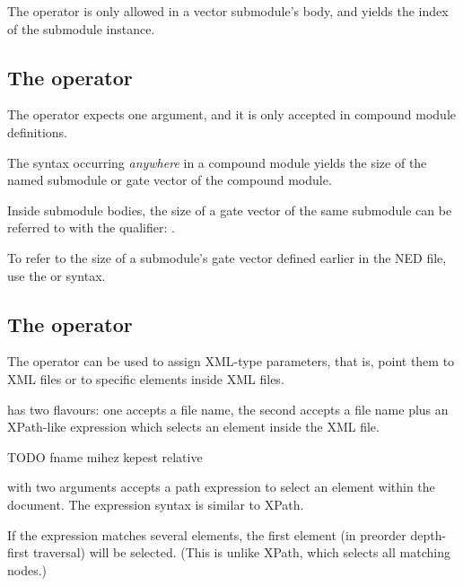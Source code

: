The  operator is only allowed in a vector submodule's body,
and yields the index of the submodule instance.


\subsection{The  operator}

The  operator expects one argument, and it is only accepted
in compound module definitions.

The  syntax occurring \textit{anywhere} in a compound
module yields the size of the named submodule or gate vector of the
compound module.

Inside submodule bodies, the size of a gate vector of the same submodule
can be referred to with the  qualifier: .

To refer to the size of a submodule's gate vector defined earlier in the
NED file, use the  or
 syntax.


\subsection{The  operator}

The  operator can be used to assign XML-type parameters,
that is, point them to XML files or to specific elements inside XML files.

 has two flavours: one accepts a file name, the second accepts
a file name plus an XPath-like expression which selects an element
inside the XML file.

TODO fname mihez kepest relative

 with two arguments accepts a path expression
to select an element within the document. The expression syntax is
similar to XPath.

If the expression matches several elements, the first element
(in preorder depth-first traversal) will be selected. (This is
unlike XPath, which selects all matching nodes.)


